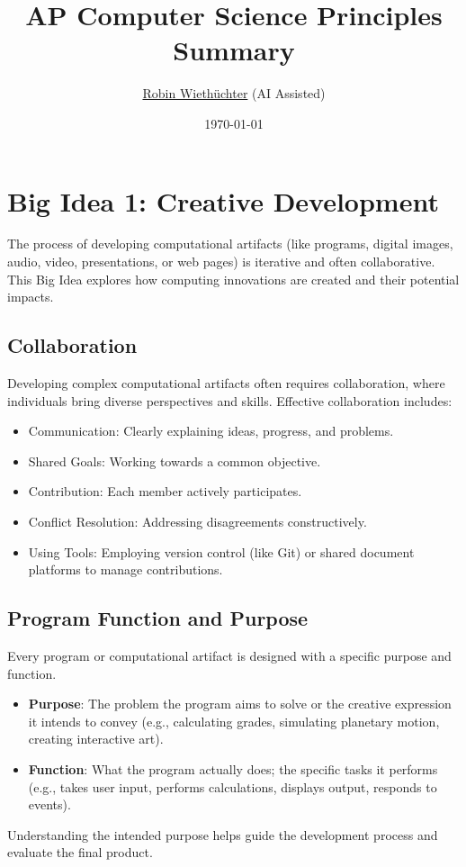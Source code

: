 \documentclass[11pt,oneside]{book}
\title{AP Computer Science Principles \\ Summary}
\author{\href{https://rowi.dev/}{Robin Wiethüchter} (AI Assisted)}
\date{\today}
\begin{document}
\maketitle

\frontmatter %
\tableofcontents

\mainmatter %

\chapter{Big Idea 1: Creative Development}
\label{chap:creative_development}

The process of developing computational artifacts (like programs, digital images, audio, video, presentations, or web pages) is iterative and often collaborative. This Big Idea explores how computing innovations are created and their potential impacts.

\section{Collaboration}
\label{sec:collaboration}
Developing complex computational artifacts often requires collaboration, where individuals bring diverse perspectives and skills. Effective collaboration includes:
\begin{itemize}
    \item Communication: Clearly explaining ideas, progress, and problems.
    \item Shared Goals: Working towards a common objective.
    \item Contribution: Each member actively participates.
    \item Conflict Resolution: Addressing disagreements constructively.
    \item Using Tools: Employing version control (like Git) or shared document platforms to manage contributions.
\end{itemize}

\section{Program Function and Purpose}
\label{sec:program_function_purpose}
Every program or computational artifact is designed with a specific purpose and function.
\begin{itemize}
    \item \textbf{Purpose}: The problem the program aims to solve or the creative expression it intends to convey (e.g., calculating grades, simulating planetary motion, creating interactive art).
    \item \textbf{Function}: What the program actually does; the specific tasks it performs (e.g., takes user input, performs calculations, displays output, responds to events).
\end{itemize}
Understanding the intended purpose helps guide the development process and evaluate the final product.
\end{document}
